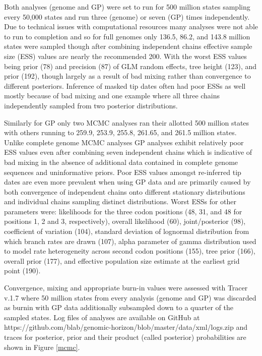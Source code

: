 \documentclass{bmcart}
\begin{document}
Both analyses (genome and GP) were set to run for 500 million states sampling  every 50,000 states and run three (genome) or seven (GP) times independently.
Due to technical issues with computational resources many analyses were not able to run to completion and so for full genomes only 136.5, 86.2, and 143.8 million states were sampled though after combining independent chains effective sample size (ESS) values are nearly the recommended 200.
With the worst ESS values being prior (78) and precision (87) of GLM random effects, tree height (123), and prior (192), though largely as a result of bad mixing rather than convergence to different posteriors.
Inference of masked tip dates often had poor ESSs as well mostly because of bad mixing and one example where all three chains independently sampled from two posterior distributions.

Similarly for GP only two MCMC analyses ran their allotted 500 million states with others running to 259.9, 253.9, 255.8, 261.65, and 261.5 million states.
Unlike complete genome MCMC analyses GP analyses exhibit relatively poor ESS values even after combining seven independent chains which is indicative of bad mixing in the absence of additional data contained in complete genome sequences and uninformative priors.
Poor ESS values amongst re-inferred tip dates are even more prevalent when using GP data and are primarily caused by both convergence of independent chains onto different stationary distributions and individual chains sampling distinct distributions.
Worst ESSs for other parameters were: likelihoods for the three codon positions (48, 31, and 48 for positions 1, 2 and 3, respectively), overall likelihood (60), joint/posterior (98), coefficient of variation (104), standard deviation of lognormal distribution from which branch rates are drawn (107), alpha parameter of gamma distribution used to model rate heterogeneity across second codon positions (155), tree prior (166), overall prior (177), and effective population size estimate at the earliest grid point (190).

Convergence, mixing and appropriate burn-in values were assessed with Tracer v.1.7 \cite{rambaut_posterior_2018} where 50 million states from every analysis (genome and GP) was discarded as burnin with GP data additionally subsampled down to a quarter of the sampled states.
Log files of analyses are available on GitHub at https://github.com/blab/genomic-horizon/blob/master/data/xml/logs.zip and traces for posterior, prior and their product (called posterior) probabilities are shown in Figure \ref{mcmc}.
\end{document}
